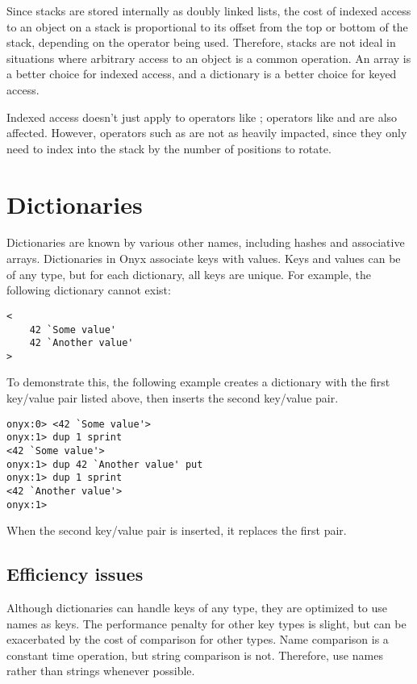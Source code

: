 Since stacks are stored internally as doubly linked lists, the cost of indexed
access to an object on a stack is proportional to its offset from the top or
bottom of the stack, depending on the operator being used.  Therefore, stacks
are not ideal in situations where arbitrary access to an object is a common
operation.  An array is a better choice for indexed access, and a dictionary is
a better choice for keyed access.

Indexed access doesn't just apply to operators like
; operators like
 and
 are also affected.  However,
operators such as  are not as heavily
impacted, since they only need to index into the stack by the number of
positions to rotate.

\section{Dictionaries}

Dictionaries are known by various other names, including hashes and associative
arrays.  Dictionaries in Onyx associate keys with values.  Keys and values can
be of any type, but for each dictionary, all keys are unique.  For example, the
following dictionary cannot exist:

\begin{verbatim}
<
    42 `Some value'
    42 `Another value'
>
\end{verbatim}

To demonstrate this, the following example creates a dictionary with the first
key/value pair listed above, then inserts the second key/value pair.

\begin{verbatim}
onyx:0> <42 `Some value'>
onyx:1> dup 1 sprint
<42 `Some value'>
onyx:1> dup 42 `Another value' put
onyx:1> dup 1 sprint
<42 `Another value'>
onyx:1>
\end{verbatim}

When the second key/value pair is inserted, it replaces the first pair.

\subsection{Efficiency issues}

Although dictionaries can handle keys of any type, they are optimized to use
names as keys.  The performance penalty for other key types is slight, but can
be exacerbated by the cost of comparison for other types.  Name comparison is a
constant time operation, but string comparison is not.  Therefore, use names
rather than strings whenever possible.

